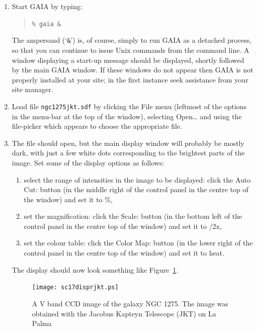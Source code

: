 \documentclass[twoside,11pt]{article}
\renewcommand{\_}{\texttt{\symbol{95}}}
\begin{document}
\begin{enumerate}

  \item Start GAIA by typing:

  \begin{quote}
   {\tt \%  gaia \&}
  \end{quote}

   The ampersand (`{\tt \&}') is, of course, simply to run GAIA as a
   detached process, so that you can continue to issue Unix commands
   from the command line.  A window displaying a start-up message should
   be displayed, shortly followed by the main GAIA window.  If these
   windows do not appear then GAIA is not properly installed at your site;
   in the first instance seek assistance from your site manager.

  \item Load file {\tt ngc1275jkt.sdf} by clicking the {\sf File} menu
   (leftmost of the options in the menu-bar at the top of the window),
   selecting {\sf Open\ldots} and using the file-picker which appears to
   choose the appropriate file.

  \item The file should open, but the main display window will probably
   be mostly dark, with just a few white dots corresponding to the
   brightest parts of the image.  Set some of the display options as
   follows:

  \begin{enumerate}

    \item select the range of intensities in the image to be displayed:
     click the {\sf Auto Cut:} button (in the middle right of the control
     panel in the centre top of the window) and set it to {\%},

    \item set the magnification: click the {\sf Scale:} button (in the
     bottom left of the control panel in the centre top of the window) and
     set it to {/2x},

    \item set the colour table: click the {\sf Color Map:} button (in the
     lower right of the control panel in the centre top of the window) and
     set it to {\sf heat}.

  \end{enumerate}

   The display should now look something like Figure~\ref{DISP_R_JKT}.

  \begin{figure}[htbp]
     \centering 
     \texttt{[image: sc17\_disp\_r\_jkt.ps]}
     \begin{quote}
     \caption[A V band CCD image of NGC 1275]
      {A V band CCD image of the galaxy NGC 1275.  The image was obtained
      with the Jacobus Kapteyn Telescope (JKT) on La Palma
     \label{DISP_R_JKT} }
     \end{quote}
  \end{figure}


\end{enumerate}
\end{document}
